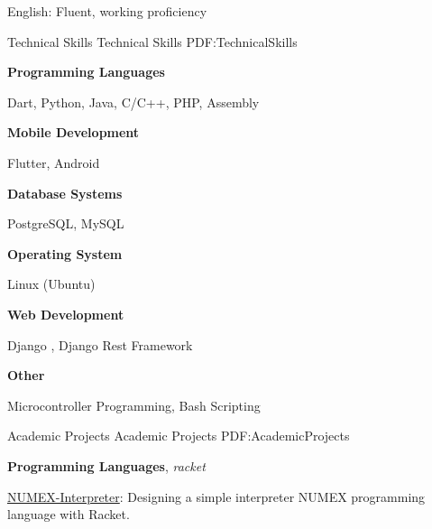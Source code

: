 \documentclass[letterpaper,MMMyyyy,nonstopmode]{resume}
\begin{document}
\begin{Body}
\Gap
\BulletItem
English: Fluent, working proficiency


\Section
{Technical Skills}
{Technical Skills}
{PDF:TechnicalSkills}

\BigGap
\BulletItem
\textbf{Programming Languages}
\begin{Detail}
\Item
Dart, Python, Java, C/C++, PHP, Assembly
\end{Detail}

\Gap
\BulletItem
\textbf{Mobile Development}
\begin{Detail}
\Item
Flutter, Android
\end{Detail}

\Gap
\BulletItem
\textbf{Database Systems}
\begin{Detail}
\Item
PostgreSQL, MySQL
\end{Detail}


\Gap
\BulletItem
\textbf{Operating System}
\begin{Detail}
\Item
Linux (Ubuntu)
\end{Detail}

\Gap
\BulletItem
\textbf{Web Development}
\begin{Detail}
\Item
Django , Django Rest Framework
\end{Detail}

\Gap
\BulletItem
\textbf{Other}
\begin{Detail}
\Item
Microcontroller Programming, Bash Scripting
\end{Detail}



\Section
{Academic Projects}
{Academic Projects}
{PDF:AcademicProjects}

\BigGap
\BulletItem
\textbf{Programming Languages},
\textit{\small{racket}}
\begin{Detail}
\SubBulletItem
\href{https://github.com/aliyazdi75/NUMEX-Interpreter}
{NUMEX-Interpreter}:
Designing a simple interpreter
NUMEX programming language with Racket.
\end{Detail}


\end{Body}
\end{document}
